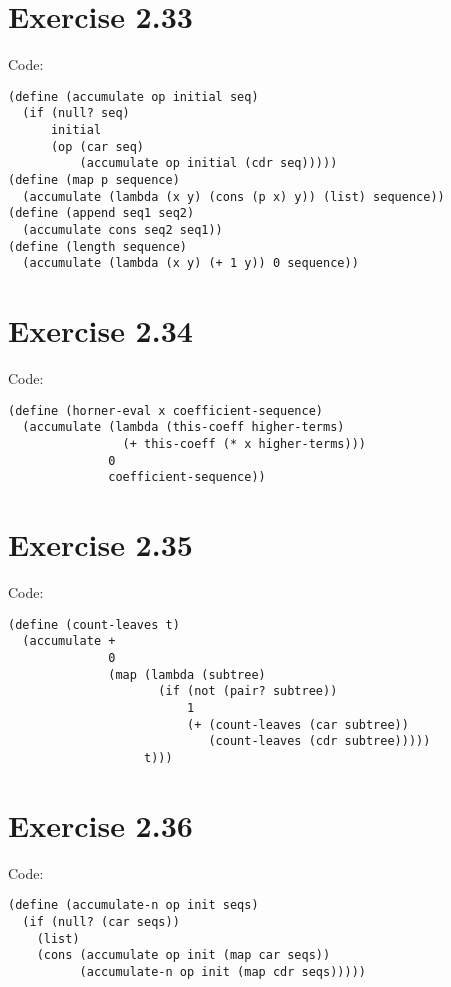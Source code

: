 \documentclass[../main.tex]{subfiles}
\begin{document}
\section{Exercise 2.33}

Code:

\begin{lstlisting}
(define (accumulate op initial seq)
  (if (null? seq)
      initial
      (op (car seq)
          (accumulate op initial (cdr seq)))))
(define (map p sequence)
  (accumulate (lambda (x y) (cons (p x) y)) (list) sequence))
(define (append seq1 seq2)
  (accumulate cons seq2 seq1))
(define (length sequence)
  (accumulate (lambda (x y) (+ 1 y)) 0 sequence))
\end{lstlisting}

\section{Exercise 2.34}

Code:

\begin{lstlisting}
(define (horner-eval x coefficient-sequence)
  (accumulate (lambda (this-coeff higher-terms)
                (+ this-coeff (* x higher-terms)))
              0
              coefficient-sequence))
\end{lstlisting}

\section{Exercise 2.35}

Code:

\begin{lstlisting}
(define (count-leaves t)
  (accumulate +
              0
              (map (lambda (subtree)
                     (if (not (pair? subtree))
                         1
                         (+ (count-leaves (car subtree))
                            (count-leaves (cdr subtree)))))
                   t)))
\end{lstlisting}

\section{Exercise 2.36}

Code:

\begin{lstlisting}
(define (accumulate-n op init seqs)
  (if (null? (car seqs))
    (list)
    (cons (accumulate op init (map car seqs))
          (accumulate-n op init (map cdr seqs)))))
\end{lstlisting}
\end{document}
